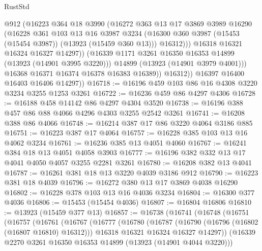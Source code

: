 \begin{lexlean}{RustStd}
\begin{coremodule}
                      @912
                      (@16223
                        @364
                        @18
                        @3990
                        (@16272
                          @363
                          @13
                          @17
                          @3869
                          @3989
                          @16290
                          (@16228
                            @361
                            @103
                            @13
                            @16
                            @3987
                            @3234
                            (@16300 @360 @3987 (@15453 (@15454 @3987)) (@13923 (@15459 @360 @13)))
                            @16312)))
                      @16318
                      @16321
                      @16324
                      @16327
                      @14297))
                  (@16339 @1171 @3261 @16350 @16353 @14899 (@13923 (@14901 @3995 @3220)))
                  @14899
                  (@13923 (@14901 @3979 @4001)))
                @16368
                @16371
                @16374
                @16378
                @16383
                @16389))
            @16312))
        @16397
        @16400
        @16403
        @16406
        @14297))
@16718 := @16196 @459 @103 @86 @16 @4308 @3220 @3234 @3255 @1253 @3261
@16722 := @16236 @459 @86 @4297 @4306
@16728 := @16188 @458 @14142 @86 @4297 @4304 @3520
@16738 := @16196 @388 @457 @86 @88 @4066 @4296 @4303 @3255 @2542 @3261
@16741 := @16208 @388 @86 @4066
@16748 := @16214 @387 @17 @86 @3220 @4064 @3186 @885
@16751 := @16223 @387 @17 @4064
@16757 := @16228 @385 @103 @13 @16 @4062 @3234
@16761 := @16236 @385 @13 @4051 @4060
@16767 := @16241 @384 @18 @13 @4051 @4058 @3903
@16777 := @16196 @382 @332 @13 @17 @4041 @4050 @4057 @3255 @2281 @3261
@16780 := @16208 @382 @13 @4041
@16787 := @16261 @381 @18 @13 @3220 @4039 @3186 @912
@16790 := @16223 @381 @18 @4039
@16796 := @16272 @380 @13 @17 @3869 @4038 @16290
@16802 := @16228 @378 @103 @13 @16 @4036 @3234
@16804 := @16300 @377 @4036
@16806 := @15453 (@15454 @4036)
@16807 := @16804 @16806
@16810 := @13923 (@15459 @377 @13)
@16857 := @16738
    (@16741
      (@16748
        (@16751
          (@16757
            (@16761
              (@16767
                (@16777
                  (@16780
                    (@16787
                      (@16790 (@16796 (@16802 (@16807 @16810) @16312)))
                      @16318
                      @16321
                      @16324
                      @16327
                      @14297))
                  (@16339 @2270 @3261 @16350 @16353 @14899 (@13923 (@14901 @4044 @3220)))

\end{coremodule}
\end{lexlean}
